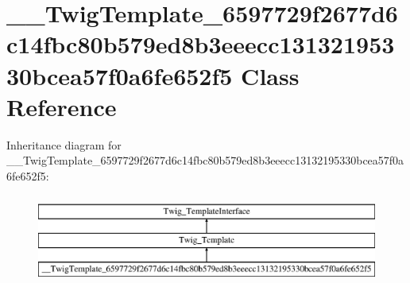 \hypertarget{class_____twig_template__6597729f2677d6c14fbc80b579ed8b3eeecc13132195330bcea57f0a6fe652f5}{}\section{\+\_\+\+\_\+\+Twig\+Template\+\_\+6597729f2677d6c14fbc80b579ed8b3eeecc13132195330bcea57f0a6fe652f5 Class Reference}
\label{class_____twig_template__6597729f2677d6c14fbc80b579ed8b3eeecc13132195330bcea57f0a6fe652f5}
Inheritance diagram for \+\_\+\+\_\+\+Twig\+Template\+\_\+6597729f2677d6c14fbc80b579ed8b3eeecc13132195330bcea57f0a6fe652f5\+:\begin{figure}[H]
\begin{center}
\leavevmode
\includegraphics[height=3.000000cm]{class_____twig_template__6597729f2677d6c14fbc80b579ed8b3eeecc13132195330bcea57f0a6fe652f5}
\end{center}
\end{figure}

